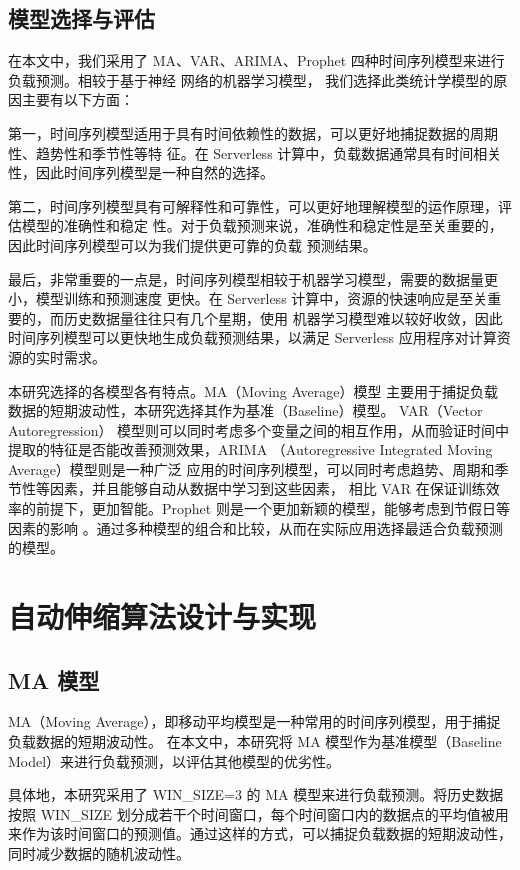 \documentclass[a4paper,AutoFakeBold,oneside,12pt]{book}
\begin{document}
\subsection{模型选择与评估}

在本文中，我们采用了 MA、VAR、ARIMA、Prophet 四种时间序列模型来进行负载预测。相较于基于神经
网络的机器学习模型，
我们选择此类统计学模型的原因主要有以下方面：

第一，时间序列模型适用于具有时间依赖性的数据，可以更好地捕捉数据的周期性、趋势性和季节性等特
征。在 Serverless 计算中，负载数据通常具有时间相关性，因此时间序列模型是一种自然的选择。

第二，时间序列模型具有可解释性和可靠性，可以更好地理解模型的运作原理，评估模型的准确性和稳定
性。对于负载预测来说，准确性和稳定性是至关重要的，因此时间序列模型可以为我们提供更可靠的负载
预测结果。

最后，非常重要的一点是，时间序列模型相较于机器学习模型，需要的数据量更小，模型训练和预测速度
更快。在 Serverless 计算中，资源的快速响应是至关重要的，而历史数据量往往只有几个星期，使用
机器学习模型难以较好收敛，因此时间序列模型可以更快地生成负载预测结果，以满足 Serverless 
应用程序对计算资源的实时需求。

本研究选择的各模型各有特点。MA（Moving Average）模型
主要用于捕捉负载数据的短期波动性，本研究选择其作为基准（Baseline）模型。
VAR（Vector Autoregression）
模型则可以同时考虑多个变量之间的相互作用，从而验证时间中提取的特征是否能改善预测效果，ARIMA
（Autoregressive Integrated Moving Average）模型则是一种广泛
应用的时间序列模型，可以同时考虑趋势、周期和季节性等因素，并且能够自动从数据中学习到这些因素，
相比 VAR 在保证训练效率的前提下，更加智能。Prophet 则是一个更加新颖的模型，能够考虑到节假日等因素的影响
。通过多种模型的组合和比较，从而在实际应用选择最适合负载预测的模型。

\section{自动伸缩算法设计与实现}
\subsection{MA 模型}

MA（Moving Average），即移动平均模型是一种常用的时间序列模型，用于捕捉负载数据的短期波动性。
在本文中，本研究将 MA 模型作为基准模型（Baseline Model）来进行负载预测，以评估其他模型的优劣性。

具体地，本研究采用了 WIN\_SIZE=3 的 MA 模型来进行负载预测。将历史数据按照 WIN\_SIZE 划分成若干个时间窗口，每个时间窗口内的数据点的平均值被用来作为该时间窗口的预测值。通过这样的方式，可以捕捉负载数据的短期波动性，同时减少数据的随机波动性。
\end{document}

